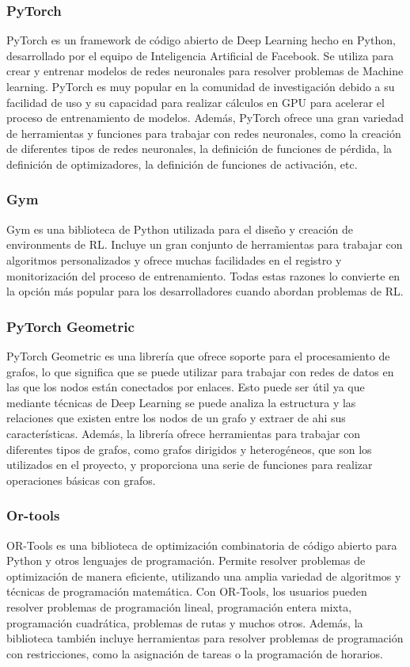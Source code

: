\subsubsection{PyTorch}
PyTorch \cite{PyTorch} es un framework de código abierto de Deep Learning hecho en Python, desarrollado por el equipo 
de Inteligencia Artificial de Facebook. Se utiliza para crear y entrenar modelos de redes neuronales para resolver 
problemas de Machine learning. PyTorch es muy popular en la comunidad de investigación debido a su facilidad de uso 
y su capacidad para realizar cálculos en GPU para acelerar el proceso de entrenamiento de modelos. Además, PyTorch
ofrece una gran variedad de herramientas y funciones para trabajar con redes neuronales, como la creación de
diferentes tipos de redes neuronales, la definición de funciones de pérdida, la definición de optimizadores, la 
definición de funciones de activación, etc.

\subsubsection{Gym}
Gym \cite{Gym} es una biblioteca de Python utilizada para el diseño y creación de environments de RL. Incluye un 
gran conjunto de herramientas para trabajar con algoritmos personalizados y ofrece muchas facilidades en 
el registro y monitorización del proceso de entrenamiento. Todas estas razones lo convierte en la opción más popular 
para los desarrolladores cuando abordan problemas de RL.

\subsubsection{PyTorch Geometric}
PyTorch Geometric \cite{pytorch-geometric} es una librería que ofrece soporte para el procesamiento de grafos, lo que significa 
que se puede utilizar para trabajar con redes de datos en las que los nodos están conectados por enlaces. 
Esto puede ser útil ya que mediante técnicas de Deep Learning se puede analiza la estructura y las 
relaciones que existen entre los nodos de un grafo y extraer de ahi sus características. Además, la 
librería ofrece herramientas para trabajar con diferentes tipos de grafos, como grafos dirigidos y heterogéneos, 
que son los utilizados en el proyecto, y proporciona una serie de funciones para realizar 
operaciones básicas con grafos.

\subsubsection{Or-tools}
OR-Tools \cite{ortools} es una biblioteca de optimización combinatoria de código abierto para Python y otros 
lenguajes de programación. Permite resolver problemas de optimización de manera eficiente, utilizando una 
amplia variedad de algoritmos y técnicas de programación matemática. Con OR-Tools, los usuarios pueden 
resolver problemas de programación lineal, programación entera mixta, programación cuadrática, 
problemas de rutas y muchos otros. Además, la biblioteca también incluye herramientas para resolver 
problemas de programación con restricciones, como la asignación de tareas o la programación de horarios.

